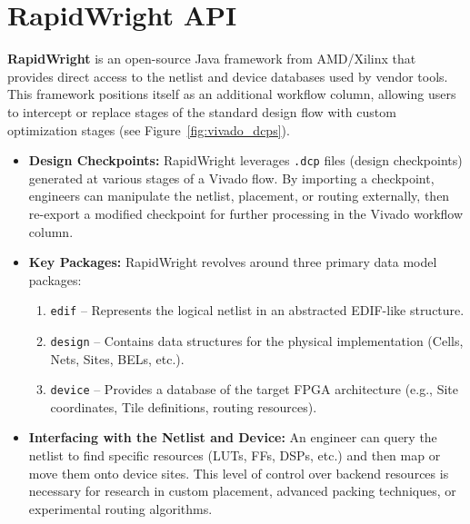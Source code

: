 
\section{RapidWright API}
\label{sec:rapidwright_api}

\textbf{RapidWright} is an open-source Java framework from AMD/Xilinx that provides direct access to the netlist and device databases used by vendor tools. 
This framework positions itself as an additional workflow column, allowing users to intercept or replace stages of the standard design flow with custom optimization stages (see Figure~\ref{fig:vivado_dcps}).

\begin{itemize}
\item \textbf{Design Checkpoints:} 
    RapidWright leverages \texttt{.dcp} files (design checkpoints) generated at various stages of a Vivado flow. 
    By importing a checkpoint, engineers can manipulate the netlist, placement, or routing externally, then re-export a modified checkpoint for further processing in the Vivado workflow column.

\item \textbf{Key Packages:} 
    RapidWright revolves around three primary data model packages:
    \begin{enumerate}
    \item \texttt{edif} -- Represents the logical netlist in an abstracted EDIF-like structure.
    \item \texttt{design} -- Contains data structures for the physical implementation (Cells, Nets, Sites, BELs, etc.).
    \item \texttt{device} -- Provides a database of the target FPGA architecture (e.g., Site coordinates, Tile definitions, routing resources).
    \end{enumerate}

\item \textbf{Interfacing with the Netlist and Device:} 
    An engineer can query the netlist to find specific resources (LUTs, FFs, DSPs, etc.) and then map or move them onto device sites. 
    This level of control over backend resources is necessary for research in custom placement, advanced packing techniques, or experimental routing algorithms.
\end{itemize}

